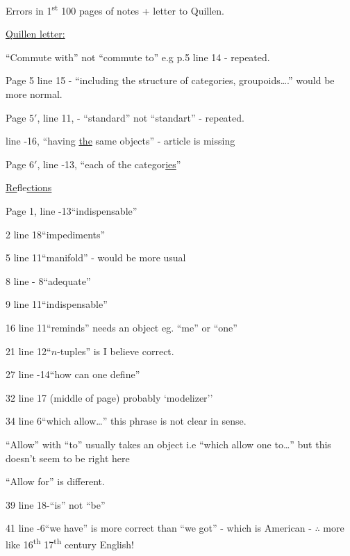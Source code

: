 \begin{center}Errors in 1\textsuperscript{st} 100 pages of notes + letter to Quillen.\end{center}

\uline{Quillen letter:}

``Commute with'' not ``commute to'' e.g p.5 line 14 - repeated.

Page 5 line 15 - ``including the structure of categories, groupoids\ldots.'' would be more normal.

Page $5'$, line 11, - ``standard'' not ``standart'' - repeated.

line -16, ``having \uline{the} same objects'' - article is missing

Page $6'$, line -13, ``each of the categor\uline{ies}''

\uline{Re}fle\uline{ctions}

Page 1, line -13\quad ``indispensable''

2 line 18\quad ``impediments''

5 line 11\quad ``manifold'' - would be more usual

8 line - 8\quad ``adequate''

9 line 11\quad ``indispensable''

16 line 11\quad ``reminds'' needs an object eg. ``me'' or ``one''

21 line 12\quad ``$n$-tuples'' is I believe correct.

27 line -14\quad ``how can one define''

32 line 17 (middle of page) probably `modelizer''

34 line 6\quad ``which allow\ldots'' this phrase is not clear in sense.

``Allow'' with ``to'' usually takes an object i.e ``which allow one to\ldots'' but this doesn't seem to be right here

``Allow for'' is different.

39 line 18-``is'' not ``be''

41 line -6\quad ``we have'' is more correct than ``we got'' - which is American - $\therefore$ more like 16\textsuperscript{th}  17\textsuperscript{th} century English!

